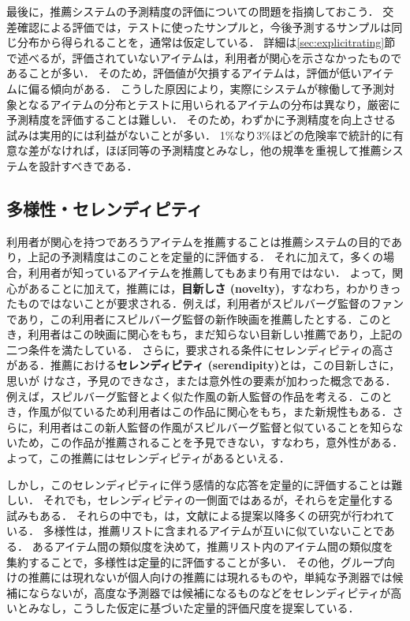 最後に，推薦システムの予測精度の評価についての問題を指摘しておこう．
交差確認による評価では，テストに使ったサンプルと，今後予測するサンプルは同じ分布から得られることを，通常は仮定している．
詳細は\ref{sec:explicitrating}節で述べるが，評価されていないアイテムは，利用者が関心を示さなかったものであることが多い．
そのため，評価値が欠損するアイテムは，評価が低いアイテムに偏る傾向がある．
こうした原因により，実際にシステムが稼働して予測対象となるアイテムの分布とテストに用いられるアイテムの分布は異なり，厳密に予測精度を評価することは難しい．
そのため，わずかに予測精度を向上させる試みは実用的には利益がないことが多い．
1\%なり3\%ほどの危険率で統計的に有意な差がなければ，ほぼ同等の予測精度とみなし，他の規準を重視して推薦システムを設計すべきである．

\subsection{多様性・セレンディピティ}

利用者が関心を持つであろうアイテムを推薦することは推薦システムの目的であり，上記の予測精度はこのことを定量的に評価する．
それに加えて，多くの場合，利用者が知っているアイテムを推薦してもあまり有用ではない．
よって，関心があることに加えて，推薦には，\textbf{目新しさ (novelty)}，すなわち，わかりきったものではないことが要求される．例えば，利用者がスピルバーグ監督のファンであり，この利用者にスピルバーグ監督の新作映画を推薦したとする．このとき，利用者はこの映画に関心をもち，まだ知らない目新しい推薦であり，上記の二つ条件を満たしている．
さらに，要求される条件にセレンディピティの高さがある．推薦における\textbf{セレンディピティ (serendipity)}とは，この目新しさに，思いが
けなさ，予見のできなさ，または意外性の要素が加わった概念である．
例えば，スピルバーグ監督とよく似た作風の新人監督の作品を考える．このとき，作風が似ているため利用者はこの作品に関心をもち，また新規性もある．さらに，利用者はこの新人監督の作風がスピルバーグ監督と似ていることを知らないため，この作品が推薦されることを予見できない，すなわち，意外性がある．よって，この推薦にはセレンディピティがあるといえる．

しかし，このセレンディピティに伴う感情的な応答を定量的に評価することは難しい．
それでも，セレンディピティの一側面ではあるが，それらを定量化する試みもある．
それらの中でも，\cite{misc:033}は，文献\cite{www:05:01}による提案以降多くの研究が行われている．
多様性は，推薦リストに含まれるアイテムが互いに似ていないことである．
あるアイテム間の類似度を決めて，推薦リスト内のアイテム間の類似度を集約することで，多様性は定量的に評価することが多い．
その他，グループ向けの推薦には現れないが個人向けの推薦には現れるもの\cite{jacm:04:01}や，単純な予測器では候補にならないが，高度な予測器では候補になるもの\cite{trjsai:07:03}などをセレンディピティが高いとみなし，こうした仮定に基づいた定量的評価尺度を提案している．

